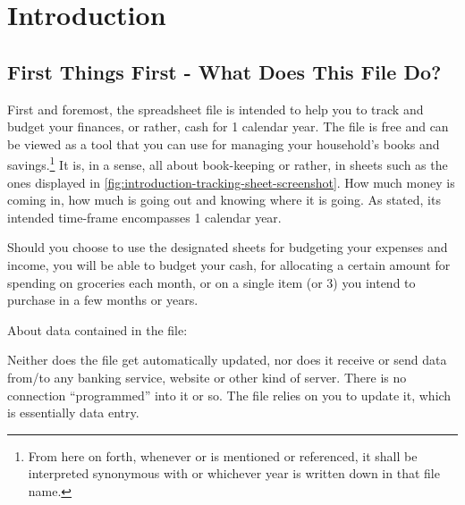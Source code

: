\section{Introduction}
\label{sec:introduction}

\subsection{First Things First - What Does This File Do?}
\label{subsec:first-things-first}

First and foremost, the spreadsheet file  is intended to help you to track and budget your finances, or rather, cash for 1 calendar year.
The file is free and can be viewed as a tool that you can use for managing your household's books and savings.\footnote{From here on forth, whenever  or \sterm{\tfn} is mentioned or referenced, it shall be interpreted synonymous with  or whichever year is written down in that file name.}
It is, in a sense, all about book-keeping or rather,  in sheets such as the ones displayed in \autoref{fig:introduction-tracking-sheet-screenshot}.
How much money is coming in, how much is going out and knowing where it is going.
As stated, its intended time-frame encompasses 1 calendar year.


\begin{comment}
\begin{figure}[htp]
	\centering
	\caption[Screenshot of the Tracking Sheet named \sheetname{Groceries}]{Screenshot of the Tracking Sheet \sheetname{Groceries}.
	d0f8934zsd.
	The values and therefor the diagrams are fake and engineered to make up some kind of scenario for the sake of the screenshot.}
	\label{fig:introduction-tracking-sheet-screenshot}
\end{figure}
\end{comment}

Should you choose to use the designated sheets for budgeting your expenses and income, you will be able to budget your cash, \eg for allocating a certain amount for spending on groceries each month, or on a single item (or 3) you intend to purchase in a few months or years.


About data contained in the file:
\begin{specialnote}
	Neither does the file get automatically updated, nor does it receive or send data from/to any banking service, website or other kind of server.
	There is no connection ``programmed'' into it or so.
	The file relies on you to update it, which is essentially data entry.	
\end{specialnote}

